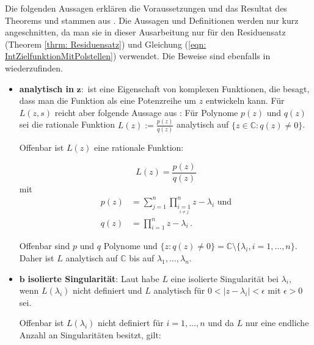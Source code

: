\documentclass[a4paper,12pt]{report}
\newcommand{\C}{\mathbb C}
\newcommand{\1}{\mathds{1}}
\theoremstyle{plain} %
\theoremstyle{definition} %
\theoremstyle{remark}
\begin{document}
            Die folgenden Aussagen erklären die Voraussetzungen und das Resultat des Theorems und stammen aus \cite{complexAnalysis}.
            Die Aussagen und Definitionen werden nur kurz angeschnitten, da man sie in dieser Ausarbeitung nur für den Residuensatz (Theorem \ref{thrm: Residuensatz})
            und Gleichung (\ref{eqn: IntZielfunktionMitPolstellen}) verwendet. Die Beweise sind ebenfalls in \cite{complexAnalysis} wiederzufinden.
            \begin{itemize}
                  \item \textbf{analytisch in }$\mathbf{z:}$ ist eine Eigenschaft von komplexen Funktionen, die besagt, dass man die Funktion als eine Potenzreihe um $z$ entwickeln kann.
                        Für $L(z, s)$ reicht aber folgende Aussage aus \cite[S. 24]{complexAnalysis}:
                        Für Polynome $p(z)$ und $q(z)$ sei die rationale Funktion $L(z):=\frac{p(z)}{q(z)}$ analytisch auf $\{z\in\C: q(z)\ne 0\}$.
                        
                        Offenbar ist $L(z)$ eine rationale Funktion:

                        $$L(z) = \frac{p(z)}{q(z)}$$
                        mit 
                        \begin{align*}
                              p(z) &= \sum_{j=1}^{n}\prod_{\underset{i\ne j}{i=1}}^{n} z-\lambda_i\text{ und}\\
                              q(z) &= \prod_{i=1}^{n} z-\lambda_i\,.
                        \end{align*}

                        Offenbar sind $p$ und $q$ Polynome und $\{z: q(z)\ne 0\} = \C\setminus\{\lambda_i, i=1,\dots,n\}$.
                        Daher ist $L$ analytisch auf $\C$ bis auf $\lambda_1,\dots,\lambda_n$.
                  \item $\mathbf{b}$\textbf{ isolierte Singularität}:
                        Laut \cite[S. 74]{complexAnalysis} habe $L$ eine isolierte Singularität bei $\lambda_i$, wenn $L(\lambda_i)$ nicht definiert
                        und $L$ analytisch für $0<|z-\lambda_i|<\epsilon$ mit $\epsilon>0$ sei.

                        Offenbar ist $L(\lambda_i)$ nicht definiert für $i=1,\dots,n$ und da $L$ nur eine endliche Anzahl an Singularitäten besitzt, gilt:


\end{itemize}
\end{document}

